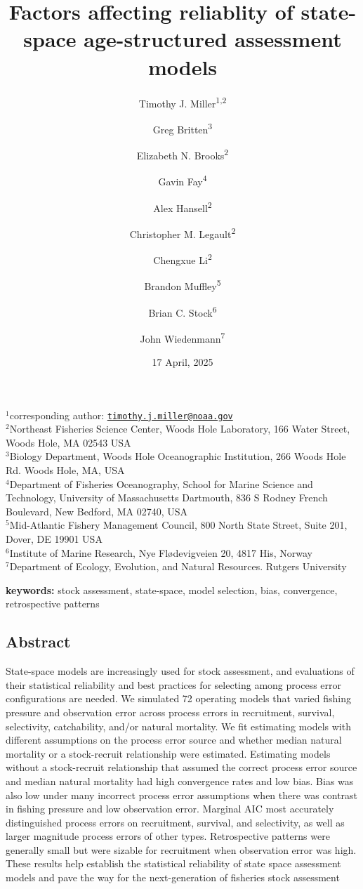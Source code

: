 \documentclass[
  12pt,
]{article}
\title{Factors affecting reliablity of state-space age-structured
assessment models}
\author{Timothy J. Miller\textsuperscript{1,2} \and Greg
Britten\textsuperscript{3} \and Elizabeth N.
Brooks\textsuperscript{2} \and Gavin Fay\textsuperscript{4} \and Alex
Hansell\textsuperscript{2} \and Christopher M.
Legault\textsuperscript{2} \and Chengxue
Li\textsuperscript{2} \and Brandon Muffley\textsuperscript{5} \and Brian
C. Stock\textsuperscript{6} \and John Wiedenmann\textsuperscript{7}}
\date{17 April, 2025}
\begin{document}
\maketitle

\(^1\)corresponding author:
\href{mailto:timothy.j.miller@noaa.gov}{\nolinkurl{timothy.j.miller@noaa.gov}}\\
\(^2\)Northeast Fisheries Science Center, Woods Hole Laboratory, 166
Water Street, Woods Hole, MA 02543 USA\\
\(^3\)Biology Department, Woods Hole Oceanographic Institution, 266
Woods Hole Rd. Woods Hole, MA, USA\\
\(^4\)Department of Fisheries Oceanography, School for Marine Science
and Technology, University of Massachusetts Dartmouth, 836 S Rodney
French Boulevard, New Bedford, MA 02740, USA\\
\(^5\)Mid-Atlantic Fishery Management Council, 800 North State Street,
Suite 201, Dover, DE 19901 USA\\
\(^6\)Institute of Marine Research, Nye Flødevigveien 20, 4817 His,
Norway\\
\(^7\)Department of Ecology, Evolution, and Natural Resources. Rutgers
University\\

\pagebreak

\textbf{keywords:} stock assessment, state-space, model selection, bias,
convergence, retrospective patterns

\hypertarget{abstract}{%
\subsection*{Abstract}\label{abstract}}

State-space models are increasingly used for stock assessment, and
evaluations of their statistical reliability and best practices for
selecting among process error configurations are needed. We simulated 72
operating models that varied fishing pressure and observation error
across process errors in recruitment, survival, selectivity,
catchability, and/or natural mortality. We fit estimating models with
different assumptions on the process error source and whether median
natural mortality or a stock-recruit relationship were estimated.
Estimating models without a stock-recruit relationship that assumed the
correct process error source and median natural mortality had high
convergence rates and low bias. Bias was also low under many incorrect
process error assumptions when there was contrast in fishing pressure
and low observation error. Marginal AIC most accurately distinguished
process errors on recruitment, survival, and selectivity, as well as
larger magnitude process errors of other types. Retrospective patterns
were generally small but were sizable for recruitment when observation
error was high. These results help establish the statistical reliability
of state space assessment models and pave the way for the
next-generation of fisheries stock assessment
\end{document}
